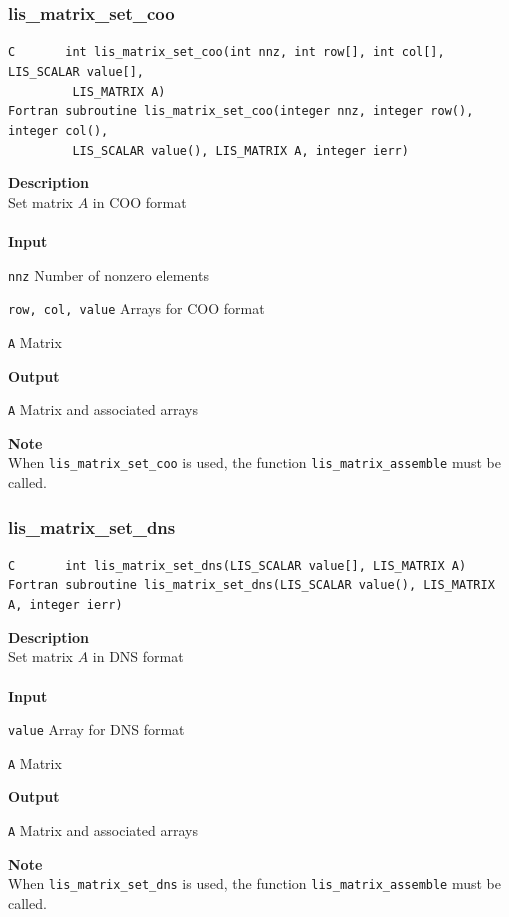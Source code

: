 \documentclass[a4paper]{article}
\newcommand{\namelistlabel}[1]{\mbox{#1}\hfill}
\newenvironment{namelist}[1]{%
 \begin{list}{}
  {\let\makelabel\namelistlabel
  \settowidth{\labelwidth}{#1}
  \setlength{\leftmargin}{1.1\labelwidth}}
}{%
\end{list}}
\begin{document}
  \subsubsection{lis\_matrix\_set\_coo}
\begin{screen}
\verb|C       int lis_matrix_set_coo(int nnz, int row[], int col[], LIS_SCALAR value[],|\\
\verb|         LIS_MATRIX A)|\\
\verb|Fortran subroutine lis_matrix_set_coo(integer nnz, integer row(), integer col(),|\\
\verb|         LIS_SCALAR value(), LIS_MATRIX A, integer ierr)|
\end{screen}
{\bf Description}\\
\indent
Set matrix $A$ in COO format
\\ \\
\noindent
{\bf Input}
\begin{namelist}{XXXXXXXXXXXXXXXXXXXX}
\item[\tt nnz] Number of nonzero elements
\item[\tt row, col, value] Arrays for COO format
\item[\tt A] Matrix
\end{namelist}
{\bf Output}
\begin{namelist}{XXXXXXXXXXXXXXXXXXXX}
\item[\tt A] Matrix and associated arrays
\end{namelist}
\noindent
{\bf Note}\\
\indent
When \verb|lis_matrix_set_coo| is used, 
the function \verb|lis_matrix_assemble| must be called. 

  \subsubsection{lis\_matrix\_set\_dns}
\begin{screen}
\verb|C       int lis_matrix_set_dns(LIS_SCALAR value[], LIS_MATRIX A)|\\
\verb|Fortran subroutine lis_matrix_set_dns(LIS_SCALAR value(), LIS_MATRIX A, integer ierr)|
\end{screen}
{\bf Description}\\
\indent
Set matrix $A$ in DNS format
\\ \\
\noindent
{\bf Input}
\begin{namelist}{XXXXXXXXXXXXXXXXXXXX}
\item[\tt value] Array for DNS format
\item[\tt A] Matrix
\end{namelist}
{\bf Output}
\begin{namelist}{XXXXXXXXXXXXXXXXXXXX}
\item[\tt A] Matrix and associated arrays
\end{namelist}
\noindent
{\bf Note}\\
\indent
When \verb|lis_matrix_set_dns| is used, 
the function \verb|lis_matrix_assemble| must be called. 
\newpage
\end{document}
